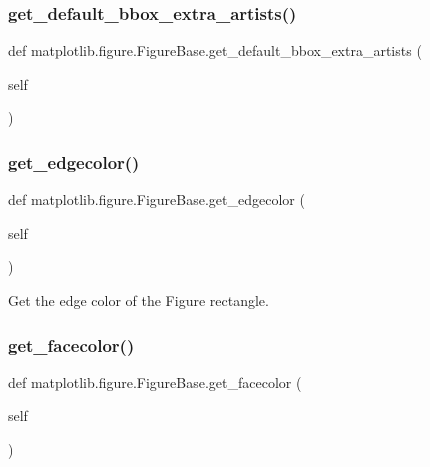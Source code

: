 \begin{DoxyVerb}
\begin{DoxyVerb}
\subsubsection{\texorpdfstring{get\+\_\+default\+\_\+bbox\+\_\+extra\+\_\+artists()}{get\_default\_bbox\_extra\_artists()}}
{\footnotesize\ttfamily def matplotlib.\+figure.\+Figure\+Base.\+get\+\_\+default\+\_\+bbox\+\_\+extra\+\_\+artists (\begin{DoxyParamCaption}\item[{}]{self }\end{DoxyParamCaption})}

\mbox{\label{classmatplotlib_1_1figure_1_1FigureBase_aabc92e00048c43c96bd245592bcb3f10}} 
\subsubsection{\texorpdfstring{get\+\_\+edgecolor()}{get\_edgecolor()}}
{\footnotesize\ttfamily def matplotlib.\+figure.\+Figure\+Base.\+get\+\_\+edgecolor (\begin{DoxyParamCaption}\item[{}]{self }\end{DoxyParamCaption})}

\begin{DoxyVerb}Get the edge color of the Figure rectangle.\end{DoxyVerb}
 \mbox{\label{classmatplotlib_1_1figure_1_1FigureBase_a08d5ecf5957f593a3e772c107c612d5a}} 
\subsubsection{\texorpdfstring{get\+\_\+facecolor()}{get\_facecolor()}}
{\footnotesize\ttfamily def matplotlib.\+figure.\+Figure\+Base.\+get\+\_\+facecolor (\begin{DoxyParamCaption}\item[{}]{self }\end{DoxyParamCaption})}


\end{DoxyVerb}
\end{DoxyVerb}
